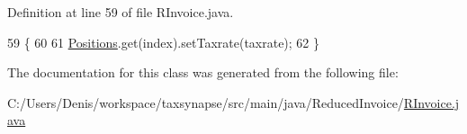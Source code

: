 Definition at line 59 of file R\+Invoice.\+java.


\begin{DoxyCode}
59                                                            \{
60 
61         \hyperlink{class_reduced_invoice_1_1_a_invoice_a5b51f1865386bd021580507c7133f69a}{Positions}.get(index).setTaxrate(taxrate);
62     \}
\end{DoxyCode}


The documentation for this class was generated from the following file\+:\begin{DoxyCompactItemize}
\item 
C\+:/\+Users/\+Denis/workspace/taxsynapse/src/main/java/\+Reduced\+Invoice/\hyperlink{_r_invoice_8java}{R\+Invoice.\+java}\end{DoxyCompactItemize}

